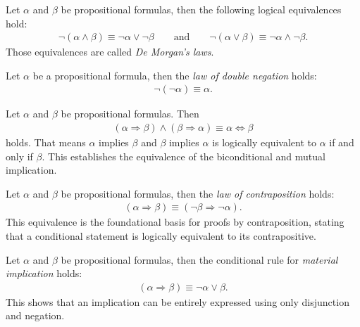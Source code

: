 \begin{examples}
    \begin{exampleenumerate}
        \item\label{example:logic:demorgan} Let $\alpha$ and $\beta$ be propositional formulas, then the following logical equivalences hold:
        \begin{align}
            \lnot(\alpha\land\beta)\equiv \lnot\alpha\lor\lnot\beta\qquad\text{and}\qquad \lnot(\alpha\lor\beta)\equiv\lnot\alpha\land\lnot\beta.
        \end{align}
        Those equivalences are called \emph{De Morgan's laws}.
        
        \item\label{example:logic:double_negation} Let $\alpha$ be a propositional formula, then the \emph{law of double negation} holds:
        \begin{align}\lnot(\lnot \alpha)\equiv \alpha.\end{align}
        
        \item\label{example:logic:biconditional_implication} Let $\alpha$ and $\beta$ be propositional formulas. Then
        \begin{align}(\alpha\Rightarrow\beta)\land(\beta\Rightarrow\alpha)\equiv\alpha\Leftrightarrow\beta\end{align}
        holds. That means $\alpha$ implies $\beta$ and $\beta$ implies $\alpha$ is logically equivalent to $\alpha$ if and only if $\beta$. This establishes the equivalence of the biconditional and mutual implication.

        \item\label{example:logic:contraposition} Let $\alpha$ and $\beta$ be propositional formulas, then the \emph{law of contraposition} holds:
        \begin{align}(\alpha\Rightarrow\beta)\equiv(\lnot\beta\Rightarrow\lnot\alpha).\end{align}
        This equivalence is the foundational basis for proofs by contraposition, stating that a conditional statement is logically equivalent to its contrapositive.

        \item\label{example:logic:material_implication} Let $\alpha$ and $\beta$ be propositional formulas, then the conditional rule for \emph{material implication} holds:
        \begin{align}(\alpha\Rightarrow\beta)\equiv\lnot\alpha\lor\beta.\end{align}
        This shows that an implication can be entirely expressed using only disjunction and negation.


\end{exampleenumerate}
\end{examples}
